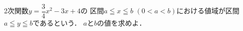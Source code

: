 \documentclass[../../main.tex]{subfiles}
\begin{document}
2次関数$\displaystyle y=\dfrac{3}{4}x^2-3x+4$の
区間$a \leqq x \leqq b$ $(0<a<b)$における値域が区間$a \leqq y \leqq b$であるという．
$a$と$b$の値を求めよ．
\end{document}
